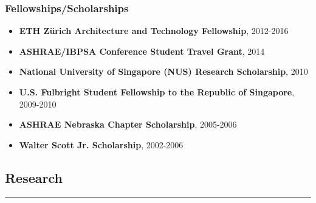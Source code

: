 \documentclass[10pt,a4paper]{article}
\begin{document}
\begin{small}





\subsubsection*{Fellowships/Scholarships}

\begin{itemize}


  \item \textbf{ETH Z\"urich Architecture and Technology Fellowship}, 2012-2016%

  \item \textbf{ASHRAE/IBPSA Conference Student Travel Grant}, 2014%

  \item \textbf{National University of Singapore (NUS) Research Scholarship}, 2010%

  \item \textbf{U.S. Fulbright Student Fellowship to the Republic of Singapore}, 2009-2010%

  \item \textbf{ASHRAE Nebraska Chapter Scholarship}, 2005-2006%

  \item \textbf{Walter Scott Jr. Scholarship}, 2002-2006%


\end{itemize}





\subsection*{Research}
\hrule
\vspace{0.2cm}



\end{small}
\end{document}
